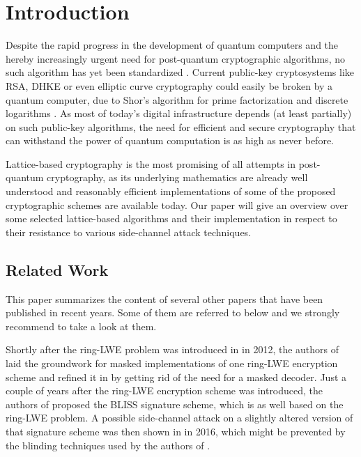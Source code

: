 %
%

\chapter{Introduction}
Despite the rapid progress in the development of quantum computers and the hereby increasingly urgent need for post-quantum cryptographic algorithms, no such algorithm has yet been standardized \cite{Nist}. Current public-key cryptosystems like RSA, DHKE or even elliptic curve cryptography could easily be broken by a quantum computer, due to Shor's algorithm for prime factorization and discrete logarithms \cite{Shor}. As most of today's digital infrastructure depends (at least partially) on such public-key algorithms, the need for efficient and secure cryptography that can withstand the power of quantum computation is as high as never before.

Lattice-based cryptography is the most promising of all attempts in post-quantum cryptography, as its underlying mathematics are already well understood and reasonably efficient implementations of some of the proposed cryptographic schemes are available today. Our paper will give an overview over some selected lattice-based algorithms and their implementation in respect to their resistance to various side-channel attack techniques.

\section{Related Work}
This paper summarizes the content of several other papers that have been published in recent years. Some of them are referred to below and we strongly recommend to take a look at them.

Shortly after the \acs{ring-LWE} problem was introduced in \cite{cryptoeprint:2012:230} in 2012, the authors of \cite{maskedRing} laid the groundwork for masked implementations of one \acs{ring-LWE} encryption scheme and refined it in \cite{Reparaz2016} by getting rid of the need for a masked decoder. Just a couple of years after the \acs{ring-LWE} encryption scheme was introduced, the authors of \cite{bliss} proposed the BLISS signature scheme, which is as well based on the \acs{ring-LWE} problem. A possible side-channel attack on a slightly altered version of that signature scheme was then shown in \cite{cryptoeprint:2016:300} in 2016, which might be prevented by the blinding techniques used by the authors of \cite{cryptoeprint:2016:276}.

